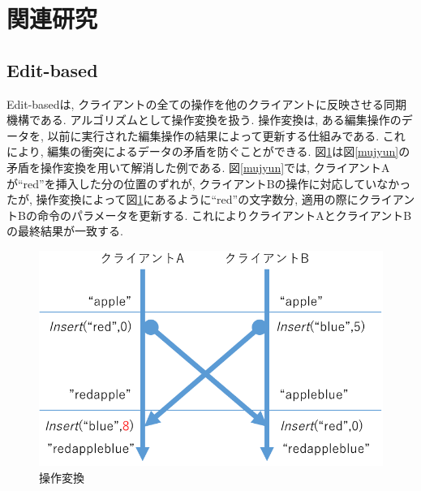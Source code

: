 \section{関連研究}
%
\subsection{Edit-based}
Edit-basedは, クライアントの全ての操作を他のクライアントに反映させる同期機構である.
アルゴリズムとして操作変換\cite{OT}を扱う.
操作変換は, ある編集操作のデータを, 以前に実行された編集操作の結果によって更新する仕組みである.
これにより, 編集の衝突によるデータの矛盾を防ぐことができる.
図\ref{ot}は図\ref{mujyun}の矛盾を操作変換を用いて解消した例である. 図\ref{mujyun}では, クライアントAが``red''を挿入した分の位置のずれが, クライアントBの操作に対応していなかったが, 操作変換によって図\ref{ot}にあるように``red''の文字数分, 適用の際にクライアントBの命令のパラメータを更新する. これによりクライアントAとクライアントBの最終結果が一致する.
\begin{figure}[]
  \begin{center}
    \includegraphics[scale=0.5]{images/ot}
    \caption{操作変換}
    \label{ot}
  \end{center}
\end{figure}
%
